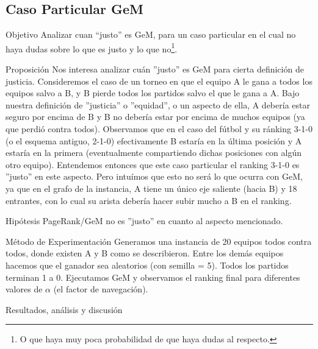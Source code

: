 \subsection{Caso Particular GeM}
\label{subsec:exp8}
\begin{LaTeXdescription}
    \item[Objetivo] Analizar cuan ``justo'' es GeM, para un caso particular en
        el cual no haya dudas sobre lo que es justo y lo que no\footnote{O que
        haya muy poca probabilidad de que haya dudas al respecto.}.\\

    \item[Proposici\'on] Nos interesa analizar cu\'an ''justo'' es GeM para
        cierta definici\'on de justicia. Consideremos el caso de un torneo en
        que el equipo A le gana a todos los equipos salvo a B, y B pierde todos
        los partidos salvo el que le gana a A. Bajo nuestra definición de
        ''justicia'' o ''equidad'', o un aspecto de ella, A deber\'ia estar
        seguro por encima de B y B no deber\'ia estar por encima de muchos
        equipos (ya que perdi\'o contra todos). Observamos que en el caso del
        f\'utbol y su ránking 3-1-0 (o el esquema antiguo, 2-1-0) efectivamente
        B estar\'ia en la \'ultima posici\'on y A estar\'ia en la primera
        (eventualmente compartiendo dichas posiciones con alg\'un otro equipo).
        Entendemos entonces que este caso particular el ranking 3-1-0 es
        ''justo'' en este aspecto. Pero intu\'imos que esto no ser\'a lo que
        ocurra con GeM, ya que en el grafo de la instancia, A tiene un \'unico
        eje saliente (hacia B) y 18 entrantes, con lo cual su arista deber\'ia
        hacer subir mucho a B en el ranking.\\

    \item[Hip\'otesis] PageRank/GeM no es ''justo'' en cuanto al aspecto
        mencionado.\\

    \item[M\'etodo de Experimentaci\'on] Generamos una instancia de 20 equipos
        todos contra todos, donde existen A y B como se describieron. Entre los
        dem\'as equipos hacemos que el ganador sea aleatorios (con semilla =
        5). Todos los partidos terminan 1 a 0. Ejecutamos GeM y observamos el
        ranking final para diferentes valores de $\alpha$ (el factor de
        navegaci\'on).\\

    \item[Resultados, an\'alisis y discusi\'on]
\end{LaTeXdescription}


